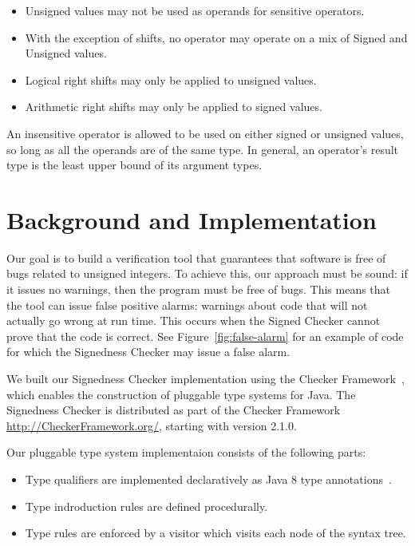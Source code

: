 \documentclass{sig-alternate-05-2015}
\begin{document}
\begin{itemize}\itemsep 0pt \parskip 0pt
  \item Unsigned values may not be used as operands for sensitive
    operators.
  \item With the exception of shifts, no operator may operate on a mix of
    Signed and Unsigned values.
  \item Logical right shifts may only be applied to unsigned values.
  \item Arithmetic right shifts may only be applied to signed values.
\end{itemize}

An insensitive operator is allowed to be used on either signed or unsigned
values, so long as all the operands are of the same type.  In general, an operator's
result type is the least upper bound of its argument types.


\section{Background and Implementation}

Our goal is to build a verification tool that guarantees that software is
free of bugs related to unsigned integers. To achieve this, our approach
must be sound:  if it issues no warnings, then the program must be free of
bugs.
This means that the tool can issue false positive alarms:  warnings about
code that will not actually go wrong at run time.  This occurs when the
Signed Checker cannot prove that the code is correct. See Figure~\ref{fig:false-alarm}
for an example of code for which the Signedness Checker may issue a false alarm.

We built our Signedness Checker implementation using the
Checker Framework~\cite{Ernst2008,DietlDEMS2011}, which enables the
construction of pluggable type systems for Java.
The Signedness Checker is distributed as part of the Checker Framework
\url{http://CheckerFramework.org/}, starting with version 2.1.0.

Our pluggable type system implementaion consists of the following parts:

\begin{itemize}\itemsep 0pt \parskip 0pt
  \item Type qualifiers are implemented declaratively as Java 8 type
    annotations~\cite{JSR308-PFD}.
  \item Type indroduction rules are defined procedurally.
  \item Type rules are enforced by a visitor which visits each node of the syntax tree.
\end{itemize}
\end{document}
